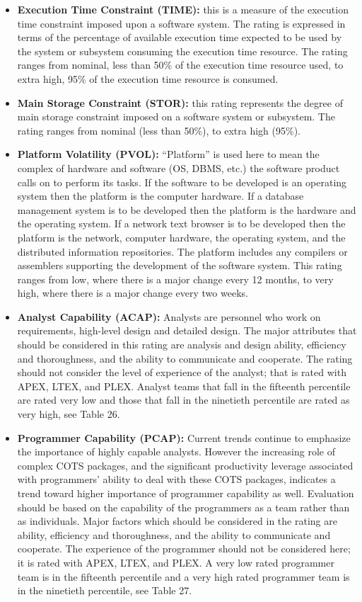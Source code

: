 \begin{itemize}
	\item\textbf{Execution Time Constraint (TIME):} this is a measure of the execution time constraint imposed upon a software system. The rating is expressed in terms of the percentage of available execution time expected to be used by the system or subsystem consuming the execution time resource. The rating ranges from nominal, less than 50\% of the execution time resource used, to extra high, 95\% of the execution time resource is consumed.
	
	\item\textbf{Main Storage Constraint (STOR):} this rating represents the degree of main storage constraint imposed on a software system or subsystem. The rating ranges from nominal (less than 50\%), to extra high (95\%). 
	
	\item\textbf{Platform Volatility (PVOL):} “Platform” is used here to mean the complex of hardware and software (OS, DBMS, etc.) the software product calls on to perform its tasks. If the software to be developed is an operating system then the platform is the computer hardware. If a database management system is to be developed then the platform is the hardware and the operating system. If a network text browser is to be developed then the platform is the network, computer hardware, the operating system, and the distributed information repositories. The platform includes any compilers or assemblers supporting the development of the software system. This rating ranges from low, where there is a major change every 12 months, to very high, where there is a major change every two weeks. 
	
	\item\textbf{Analyst Capability (ACAP):} Analysts are personnel who work on requirements, high-level design and detailed design.
	The major attributes that should be considered in this rating are analysis and design ability,
	efficiency and thoroughness, and the ability to communicate and cooperate. The rating should
	not consider the level of experience of the analyst; that is rated with APEX, LTEX, and PLEX.
	Analyst teams that fall in the fifteenth percentile are rated very low and those that fall in the
	ninetieth percentile are rated as very high, see Table 26. 
	
	\item\textbf{Programmer Capability (PCAP):} Current trends continue to emphasize the importance of highly capable analysts.
	However the increasing role of complex COTS packages, and the significant productivity
	leverage associated with programmers’ ability to deal with these COTS packages, indicates a
	trend toward higher importance of programmer capability as well.
	Evaluation should be based on the capability of the programmers as a team rather than as
	individuals. Major factors which should be considered in the rating are ability, efficiency and
	thoroughness, and the ability to communicate and cooperate. The experience of the programmer should not be considered here; it is rated with APEX, LTEX, and PLEX. A very low rated
	programmer team is in the fifteenth percentile and a very high rated programmer team is in the
	ninetieth percentile, see Table 27. 
	

\end{itemize}
